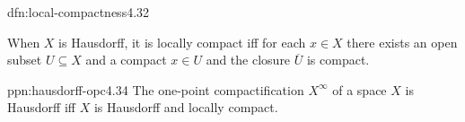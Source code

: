 \documentclass[landscape, 8pt]{extarticle}
\begin{document}
\begin{multicols}{3}
\begin{dfn}{dfn:local-compactness}{4.32}

	When $X$ is Hausdorff, it is locally compact iff for each $x\in X$ there exists an open subset $U \subseteq X$ and a compact $x \in U$ and the closure $\overline{U}$ is compact.
\end{dfn}

\begin{ppn}{ppn:hausdorff-opc}{4.34}
	The one-point compactification $X^{\infty}$ of a space $X$ is Hausdorff iff $X$ is Hausdorff and locally compact.
\end{ppn}

\lipsum[1-12]
\end{multicols}
\end{document}
